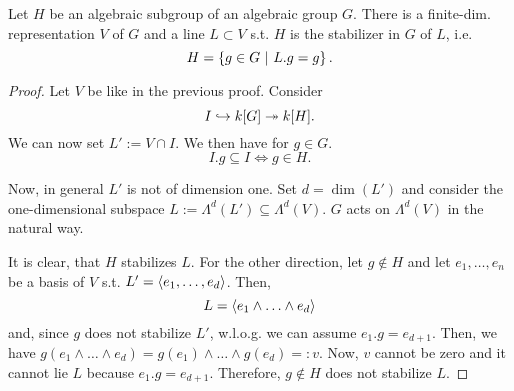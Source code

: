 \begin{theorem}
Let $H$ be an algebraic subgroup of an algebraic group $G$. There is a finite-dim. representation $V$ of $G$ and a line $L \subset V$ s.t. $H$ is the stabilizer in $G$ of $L$, i.e.
\[ H= \left\lbrace g \in G ~ | ~ L.g = g\right\rbrace. \]
\end{theorem}
\begin{proof}
	Let $V$ be like in the previous proof. Consider
	\[ I \overset{}{\hookrightarrow} k[G] \overset{}{\twoheadrightarrow} k[H]. \]
	We can now set $L' := V \cap I$. We then have for $g \in G$.
	\[ I.g \subseteq I \iff g \in H. \]
	
	Now, in general $L'$ is not of dimension one. Set $d = \dim (L')$ and consider the one-dimensional subspace $L:=\Lambda^d(L') \subseteq \Lambda^d(V)$. $G$ acts on $\Lambda^d(V)$ in the natural way.
	
	It is clear, that $H$ stabilizes $L$. For the other direction, let $g \notin H$ and let $e_1,\ldots, e_n$ be a basis of $V$ s.t. $L' = \left<e_1,\ldots, e_d\right>$. Then,
	\[ L = \left<e_1\wedge \ldots \wedge e_d\right> \]
	and, since $g$ does not stabilize $L'$, w.l.o.g. we can assume $e_1.g = e_{d+1}$.
	Then, we have $g(e_1\wedge \ldots \wedge e_d) = g(e_1)\wedge \ldots \wedge g(e_d) =: v$. Now, $v$ cannot be zero and it cannot lie $L$ because $e_1.g = e_{d+1}$. Therefore, $g\notin H$ does not stabilize $L$.
\end{proof}

